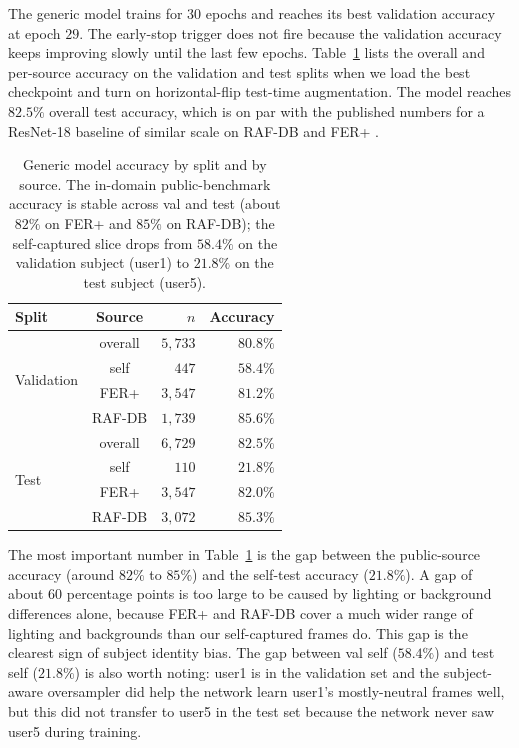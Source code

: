 \documentclass[12pt,a4paper]{article}
\begin{document}
The generic model trains for $30$ epochs and reaches its best
validation accuracy at epoch $29$. The early-stop trigger does
not fire because the validation accuracy keeps improving slowly
until the last few epochs. Table~\ref{tab:overall} lists the
overall and per-source accuracy on the validation and test
splits when we load the best checkpoint and turn on
horizontal-flip test-time augmentation. The model reaches
$82.5\%$ overall test accuracy, which is on par with the
published numbers for a ResNet-18 baseline of similar scale on
RAF-DB and FER+ \autocite{wang2020ran}.

\begin{table}[H]
  \centering
  \footnotesize
  \begin{tabular}{lcrr}
    \toprule
    Split & Source & $n$ & Accuracy \\
    \midrule
    \multirow{4}{*}{Validation}
        & overall  & $5{,}733$ & $80.8\%$ \\
        & self     & $447$     & $58.4\%$ \\
        & FER+     & $3{,}547$ & $81.2\%$ \\
        & RAF-DB   & $1{,}739$ & $85.6\%$ \\
    \midrule
    \multirow{4}{*}{Test}
        & overall  & $6{,}729$ & $82.5\%$ \\
        & self     & $110$     & $21.8\%$ \\
        & FER+     & $3{,}547$ & $82.0\%$ \\
        & RAF-DB   & $3{,}072$ & $85.3\%$ \\
    \bottomrule
  \end{tabular}
  \caption{Generic model accuracy by split and by source. The
  in-domain public-benchmark accuracy is stable across val and
  test (about $82\%$ on FER+ and $85\%$ on RAF-DB); the
  self-captured slice drops from $58.4\%$ on the validation
  subject (user1) to $21.8\%$ on the test subject (user5).}
  \label{tab:overall}
\end{table}

The most important number in Table~\ref{tab:overall} is the
gap between the public-source accuracy (around $82\%$ to $85\%$)
and the self-test accuracy ($21.8\%$). A gap of about
$60$ percentage points is too large to be caused by lighting or
background differences alone, because FER+ and RAF-DB cover a
much wider range of lighting and backgrounds than our
self-captured frames do. This gap is the clearest sign of
subject identity bias. The gap between val self ($58.4\%$) and
test self ($21.8\%$) is also worth noting: user1 is in the
validation set and the subject-aware oversampler did help the
network learn user1's mostly-neutral frames well, but this did
not transfer to user5 in the test set because the network never
saw user5 during training.
\end{document}
